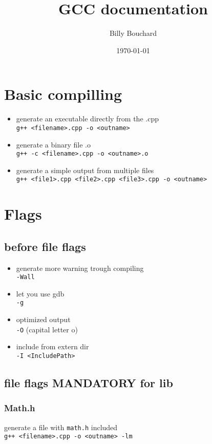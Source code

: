 \documentclass[12pt]{article}
\author{Billy Bouchard}
\title{GCC documentation}
\date{\today}
\begin{document}
\maketitle
\tableofcontents
\newpage
\section{Basic compilling}
\begin{itemize}
 \item generate an executable directly from the .cpp \\ \verb|g++ <filename>.cpp -o <outname>|
 \item generate a binary file .o \\ \verb|g++ -c <filename>.cpp -o <outname>.o|
 \item generate a simple output from multiple files \\ \verb|g++ <file1>.cpp <file2>.cpp <file3>.cpp -o <outname>|
\end{itemize}

\newpage

\section{Flags}
\subsection{before file flags}
\begin{itemize}
 \item generate more warning trough compiling \\ \verb|-Wall|
 \item let you use gdb \\ \verb|-g|
 \item optimized output \\ \verb|-O| (capital letter o)
 \item include from extern dir \\ \verb|-I <IncludePath>|
\end{itemize}
\subsection{file flags MANDATORY for lib}
\subsubsection{Math.h}
generate a file with \verb|math.h| included \\ \verb|g++ <filename>.cpp -o <outname> -lm|
\end{document}
